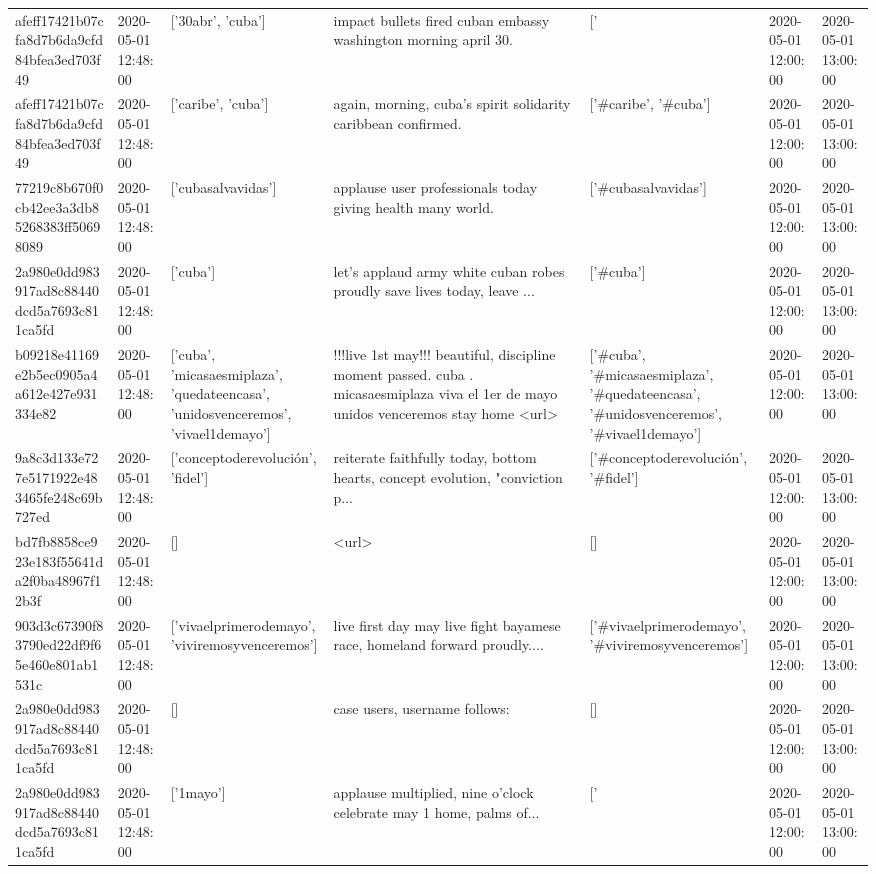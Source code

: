 \begin{tabular}{lllllll}
afeff17421b07cfa8d7b6da9cfd84bfea3ed703f49 & 2020-05-01 12:48:00 & ['30abr', 'cuba'] & impact bullets fired cuban embassy washington morning april 30. & ['#30abr', '#cuba'] & 2020-05-01 12:00:00 & 2020-05-01 13:00:00 \\
afeff17421b07cfa8d7b6da9cfd84bfea3ed703f49 & 2020-05-01 12:48:00 & ['caribe', 'cuba'] & again, morning, cuba's spirit solidarity caribbean confirmed. & ['#caribe', '#cuba'] & 2020-05-01 12:00:00 & 2020-05-01 13:00:00 \\
77219c8b670f0cb42ee3a3db85268383ff50698089 & 2020-05-01 12:48:00 & ['cubasalvavidas'] & applause user professionals today giving health many world. & ['#cubasalvavidas'] & 2020-05-01 12:00:00 & 2020-05-01 13:00:00 \\
2a980e0dd983917ad8c88440dcd5a7693c811ca5fd & 2020-05-01 12:48:00 & ['cuba'] & let's applaud army white cuban robes proudly save lives today, leave ... & ['#cuba'] & 2020-05-01 12:00:00 & 2020-05-01 13:00:00 \\
b09218e41169e2b5ec0905a4a612e427e931334e82 & 2020-05-01 12:48:00 & ['cuba', 'micasaesmiplaza', 'quedateencasa', 'unidosvenceremos', 'vivael1demayo'] & !!!live 1st may!!! beautiful, discipline moment passed. cuba . micasaesmiplaza viva el 1er de mayo unidos venceremos stay home <url> & ['#cuba', '#micasaesmiplaza', '#quedateencasa', '#unidosvenceremos', '#vivael1demayo'] & 2020-05-01 12:00:00 & 2020-05-01 13:00:00 \\
9a8c3d133e727e5171922e483465fe248c69b727ed & 2020-05-01 12:48:00 & ['conceptoderevolución', 'fidel'] & reiterate faithfully today, bottom hearts, concept evolution, "conviction p... & ['#conceptoderevolución', '#fidel'] & 2020-05-01 12:00:00 & 2020-05-01 13:00:00 \\
bd7fb8858ce923e183f55641da2f0ba48967f12b3f & 2020-05-01 12:48:00 & [] & <url> & [] & 2020-05-01 12:00:00 & 2020-05-01 13:00:00 \\
903d3c67390f83790ed22df9f65e460e801ab1531c & 2020-05-01 12:48:00 & ['vivaelprimerodemayo', 'viviremosyvenceremos'] & live first day may live fight bayamese race, homeland forward proudly.... & ['#vivaelprimerodemayo', '#viviremosyvenceremos'] & 2020-05-01 12:00:00 & 2020-05-01 13:00:00 \\
2a980e0dd983917ad8c88440dcd5a7693c811ca5fd & 2020-05-01 12:48:00 & [] & case users, username follows: & [] & 2020-05-01 12:00:00 & 2020-05-01 13:00:00 \\
2a980e0dd983917ad8c88440dcd5a7693c811ca5fd & 2020-05-01 12:48:00 & ['1mayo'] & applause multiplied, nine o'clock celebrate may 1 home, palms of... & ['#1mayo'] & 2020-05-01 12:00:00 & 2020-05-01 13:00:00 \\

\end{tabular}
